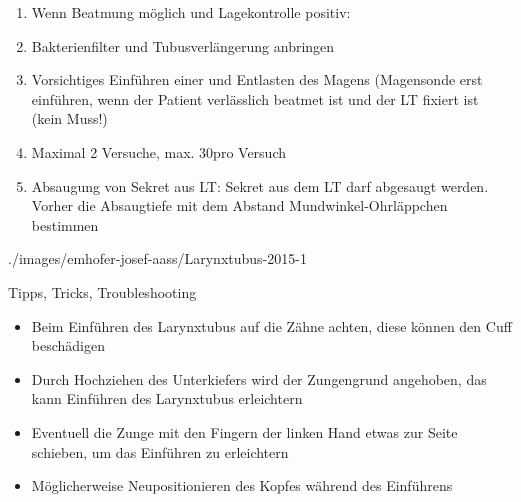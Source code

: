 {\begin{enumerate}
\begin{enumerate}
    Kapnometrie zeigt Messwert an, Kapnographie zeigt eine -Exspirationskurve, 
    oder das EasyCap II verfärbt sich. 
  \end{enumerate}
  \item Wenn Beatmung möglich und Lagekontrolle positiv: 
  \item Bakterienfilter und Tubusverlängerung anbringen
  \item Vorsichtiges Einführen einer  und Entlasten des
  Magens (Magensonde erst einführen, wenn der Patient
  verlässlich beatmet ist und der LT fixiert ist (kein Muss!)
  \item Maximal 2 Versuche, max. 30\Sec* pro Versuch
  \item Absaugung von Sekret aus LT: Sekret aus dem LT  darf
  abgesaugt werden. Vorher die Absaugtiefe mit dem Abstand
  Mundwinkel-Ohrläppchen bestimmen
\end{enumerate}


}
{}
{}
{}
{}

\begin{Synopsis}
\end{Synopsis}


{}%
{\label{fig:algorithmus-larynxtubus-reanimation}}%
{}%
{}%
{./images/emhofer-josef-aass/Larynxtubus-2015-1}%
{}%



\Text
{Tipps, Tricks, Troubleshooting}
{
\begin{itemize}
  \item Beim Einführen des Larynxtubus{\texttrademark} auf die Zähne achten, diese
  können den Cuff beschädigen
  \item Durch Hochziehen des Unterkiefers wird der
  Zungengrund angehoben, das kann Einführen des Larynxtubus{\texttrademark} 
  erleichtern
  \item Eventuell die Zunge mit den Fingern der linken Hand
  etwas zur Seite schieben, um das Einführen zu erleichtern
  \item Möglicherweise Neupositionieren des Kopfes während
  des Einführens
\end{itemize}


}
{}
{}
{}
{}

